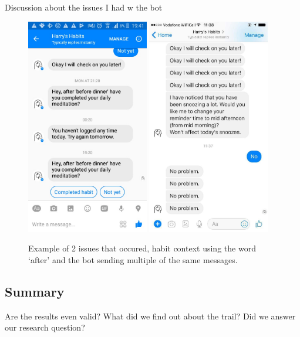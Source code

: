 Discussion about the issues I had w the bot
\begin{figure}[H]
  \centering
  \includegraphics[width=2.1in]{../resources/feedback/after-before.jpg}
  \hspace{10px}
  \includegraphics[width=2.1in]{../resources/feedback/double-messages.jpg}
  \caption{Example of 2 issues that occured, habit context using the word `after' and the bot sending multiple of the same messages.}
  \label{fig:study_bot_issues}
\end{figure}



\subsection{Summary}

Are the results even valid? What did we find out about the trail? Did we answer our research question?



